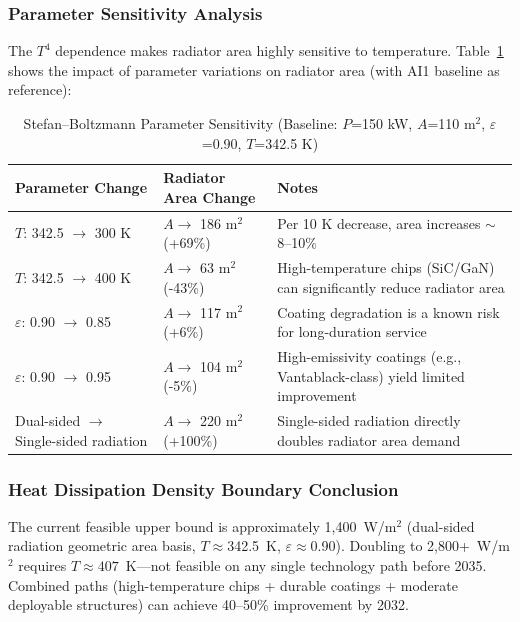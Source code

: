 \subsubsection{Parameter Sensitivity Analysis}

The $T^{4}$ dependence makes radiator area highly sensitive to temperature. Table~\ref{tab:sb-sensitivity} shows the impact of parameter variations on radiator area (with AI1 baseline as reference):

\begin{table}[H]
  \centering
  \caption{Stefan--Boltzmann Parameter Sensitivity (Baseline: $P$=150 kW, $A$=110 m$^2$, $\varepsilon$=0.90, $T$=342.5 K)}
  \label{tab:sb-sensitivity}
  \small
  \begin{tabularx}{\textwidth}{
    >{\raggedright\arraybackslash}p{2.6cm}
    >{\centering\arraybackslash}p{2.8cm}
    >{\raggedright\arraybackslash}X
  }
  \toprule
  \textbf{Parameter Change} & \textbf{Radiator Area Change} & \textbf{Notes} \\
  \midrule
  $T$: 342.5 $\to$ 300 K & $A \to$ 186 m$^2$ (+69\%) & Per 10 K decrease, area increases $\sim$8--10\% \\
  $T$: 342.5 $\to$ 400 K & $A \to$ 63 m$^2$ (-43\%) & High-temperature chips (SiC/GaN) can significantly reduce radiator area \\
  $\varepsilon$: 0.90 $\to$ 0.85 & $A \to$ 117 m$^2$ (+6\%) & Coating degradation is a known risk for long-duration service \\
  $\varepsilon$: 0.90 $\to$ 0.95 & $A \to$ 104 m$^2$ (-5\%) & High-emissivity coatings (e.g., Vantablack-class) yield limited improvement \\
  Dual-sided $\to$ Single-sided radiation & $A \to$ 220 m$^2$ (+100\%) & Single-sided radiation directly doubles radiator area demand \\
  \bottomrule
  \end{tabularx}
\end{table}

\subsubsection{Heat Dissipation Density Boundary Conclusion}

The current feasible upper bound is approximately 1,400~W/m$^2$ (dual-sided radiation geometric area basis, $T\approx$342.5~K, $\varepsilon\approx$0.90). Doubling to 2,800+~W/m$^2$ requires $T \approx 407$~K---not feasible on any single technology path before 2035. Combined paths (high-temperature chips + durable coatings + moderate deployable structures) can achieve 40--50\% improvement by 2032.

